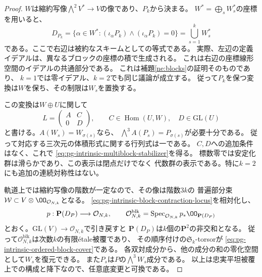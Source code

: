 \begin{proof}
$W$は縮約写像$\bigwedge^2V^*\to V$の像であり、$P_k$から決まる。
$W^*=\bigoplus_sW_s^*$の座標を用いると、
\begin{equation}
 D_{P_k}
  =\{\alpha\in W^*:(\iota_\alpha P_k)\wedge
                    (\iota_\alpha P_k)=0\}
  =\bigcup_{s=1}^kW_s^*
 \label{eq:pg-intrinsic-block-contraction-locus}
\end{equation}
である。ここで右辺は被約なスキームとしての等式である。
実際、左辺の定義イデアルは、異なるブロックの座標の積で生成される。
これは右辺の座標線形空間のイデアルの共通部分である。
これは補題\ref{ne:blocks}の証明そのものであり、
$k=1$では零イデアル、$k=2$でも同じ議論が成立する。
従って$P_k$を保つ変換は$W$を保ち、その制限は$W_s$を置換する。

この変換は$W\oplus U$に関して
\begin{equation}
 L=\begin{pmatrix}A&C\\0&D\end{pmatrix},\qquad
 C\in\operatorname{Hom}(U,W),\quad D\in\mathrm{GL}(U)
 \label{eq:pg-intrinsic-block-stabilizer-matrix}
\end{equation}
と書ける。$A(W_s)=W_{\sigma(s)}$なら、
$\bigwedge^3A(P_s)=P_{\sigma(s)}$が必要十分である。
従って対応する三次元の体積形式に関する行列式は一である。
$C,D$への追加条件はなく、これで
\eqref{eq:pg-intrinsic-multiblock-stabilizer}を得る。
標数零では安定化群は滑らかであり、この表示は閉点だけでなく
代数群の表示である。特に$k=2$にも追加の連続対称性はない。

軌道上では縮約写像の階数が一定なので、その像は階数$3k$の
普遍部分束$\mathcal W\subset V\otimes\OO_{\mathcal O_{N,k}}$となる。
\eqref{eq:pg-intrinsic-block-contraction-locus}を相対化し、
\begin{equation}
 p:\mathbf P(D_P)\longrightarrow\mathcal O_{N,k},\qquad
 \mathcal O_{N,k}^{\mathrm{blk}}
   =\operatorname{Spec}_{\mathcal O_{N,k}}p_*\OO_{\mathbf P(D_P)}
 \label{eq:pg-intrinsic-unordered-block-cover}
\end{equation}
とおく。$\mathrm{GL}(V)\to\mathcal O_{N,k}$で引き戻すと
$\mathbf P(D_P)$は$k$個の$\mathbf P^2$の非交和となる。
従って$\mathcal O_{N,k}^{\mathrm{blk}}$は次数$k$の有限\'etale被覆であり、
その順序付けの$\mathfrak S_k$-torsorが
\eqref{eq:pg-intrinsic-ordered-block-cover}である。
各双対成分から、他の成分の和の零化空間として$W_s$を復元できる。
また$P_s$は$P$の$\bigwedge^3W_s$成分である。
以上は忠実平坦被覆上での構成と降下なので、任意底変更と可換である。
\end{proof}

